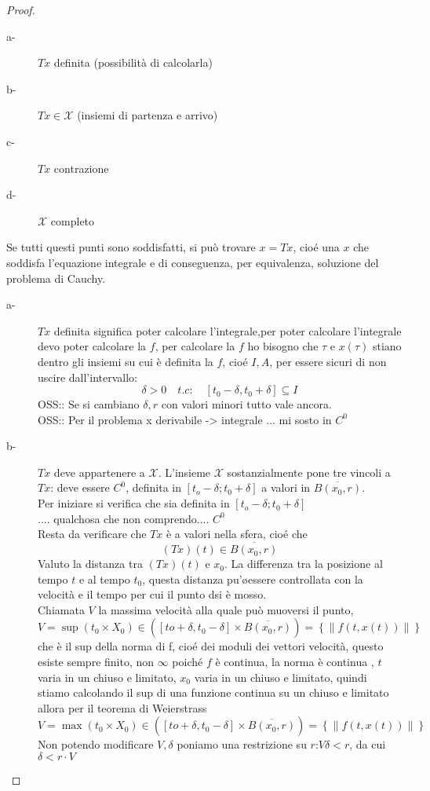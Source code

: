 \begin{proof}
\begin{description}
		\item[a-] $Tx$ definita (possibilità di calcolarla)
		\item[b-] $Tx\in\mathcal{X}$ (insiemi di partenza e arrivo)
		\item[c-] $Tx$ contrazione
		\item[d-] $\mathcal{X}$ completo
	\end{description}
	Se tutti questi punti sono soddisfatti, si può trovare $x=Tx$, cio\'e una $x$ che soddisfa l'equazione integrale e di conseguenza, per equivalenza, soluzione del problema di Cauchy.  
	\begin{description}
		\item[a-] $Tx$ definita significa poter calcolare l'integrale,per poter calcolare l'integrale devo poter calcolare la $f$, per calcolare la $f$ ho bisogno che $\tau$ e $x(\tau)$ stiano dentro gli insiemi su cui è definita la $f$, cio\'e $I,A$, per essere sicuri di non uscire dall'intervallo:
		$$\delta>0\quad t.c:\quad \left[t_0-\delta,t_0+\delta\right]\subseteq I$$
		OSS:: Se si cambiano $\delta, r$ con valori minori tutto vale ancora.\\
		OSS:: Per il problema x derivabile -> integrale  ... mi sosto in $C^0$
		\item[b-] $Tx$ deve appartenere a $\mathcal{X}$. L'insieme $\mathcal{X}$ sostanzialmente pone tre vincoli a $Tx$: deve essere $C^0$, definita in $\left[t_o-\delta;t_0+\delta\right]$ a valori in $\overline{B(x_0,r)}$.\\
		Per iniziare si verifica che sia definita in $\left[t_o-\delta;t_0+\delta\right]$\\
		.... qualchosa che non comprendo.... $C^0$\\
		Resta da verificare che $Tx$ è a valori nella sfera, cio\'e che 
		$$(Tx)(t) \in \overline{B(x_0,r)}$$
		Valuto la distanza tra $(Tx)(t)$ e $x_0$. La differenza tra la posizione al tempo $t$ e al tempo $t_0$, questa distanza pu'\o essere controllata con la velocità e il tempo per cui il punto dsi è mosso.\\
		Chiamata $V$ la massima velocità alla quale può muoversi il punto, $V=\sup\limits{(t_0\times X_0)\in (\left[to+\delta,t_0-\delta\right]\times\overline{B(x_0,r)})}=\left\{\left\|f(t,x(t))\right\|\right\}$ che è il sup della norma di f, cio\'e dei moduli dei vettori velocità, questo esiste sempre finito, non $\infty$ poiché $f$ è continua, la norma è continua , $t$ varia in un chiuso e limitato, $x_0$ varia in un chiuso e limitato, quindi stiamo calcolando  il sup di una funzione continua su un chiuso e limitato allora per il teorema di Weierstrass $V=\max\limits{(t_0\times X_0)\in (\left[to+\delta,t_0-\delta\right]\times\overline{B(x_0,r)})}=\left\{\left\|f(t,x(t))\right\|\right\}$\\
		Non potendo modificare $V, \delta$ poniamo una restrizione su $r$:$V\delta < r$, da cui $\delta < r\cdot V$
		

\end{description}
\end{proof}
